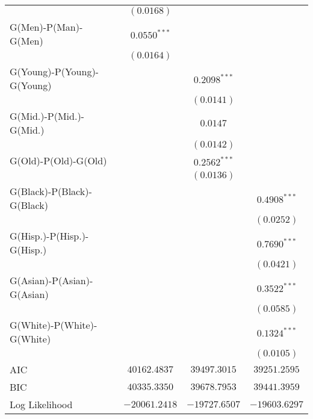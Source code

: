 \begin{center}
\begin{longtable}{l c c c}
                           & $(0.0168)$     &                 &                 \\
G(Men)-P(Man)-G(Men)       & $0.0550^{***}$ &                 &                 \\
                           & $(0.0164)$     &                 &                 \\
G(Young)-P(Young)-G(Young) &                & $0.2098^{***}$  &                 \\
                           &                & $(0.0141)$      &                 \\
G(Mid.)-P(Mid.)-G(Mid.)    &                & $0.0147$        &                 \\
                           &                & $(0.0142)$      &                 \\
G(Old)-P(Old)-G(Old)       &                & $0.2562^{***}$  &                 \\
                           &                & $(0.0136)$      &                 \\
G(Black)-P(Black)-G(Black) &                &                 & $0.4908^{***}$  \\
                           &                &                 & $(0.0252)$      \\
G(Hisp.)-P(Hisp.)-G(Hisp.) &                &                 & $0.7690^{***}$  \\
                           &                &                 & $(0.0421)$      \\
G(Asian)-P(Asian)-G(Asian) &                &                 & $0.3522^{***}$  \\
                           &                &                 & $(0.0585)$      \\
G(White)-P(White)-G(White) &                &                 & $0.1324^{***}$  \\
                           &                &                 & $(0.0105)$      \\
\midrule
AIC                        & $40162.4837$   & $39497.3015$    & $39251.2595$    \\
BIC                        & $40335.3350$   & $39678.7953$    & $39441.3959$    \\
Log Likelihood             & $-20061.2418$  & $-19727.6507$   & $-19603.6297$   \\
\end{longtable}
\end{center}
